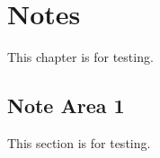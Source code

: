 
\chapter{Notes}
\label{loc:Notes}


This chapter is for testing.

\section{Note Area 1}
\label{loc:Notes_1}


This section is for testing.
